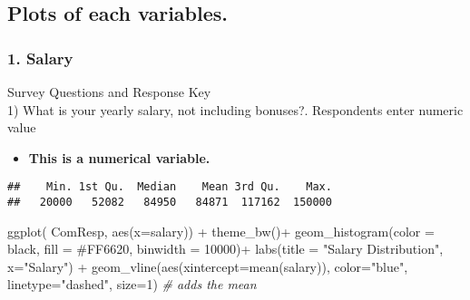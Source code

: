 \documentclass[
]{article}
\newenvironment{Shaded}{\begin{snugshade}}{\end{snugshade}}
\newcommand{\AttributeTok}[1]{\textcolor[rgb]{0.77,0.63,0.00}{#1}}
\newcommand{\CommentTok}[1]{\textcolor[rgb]{0.56,0.35,0.01}{\textit{#1}}}
\newcommand{\DecValTok}[1]{\textcolor[rgb]{0.00,0.00,0.81}{#1}}
\newcommand{\FunctionTok}[1]{\textcolor[rgb]{0.00,0.00,0.00}{#1}}
\newcommand{\NormalTok}[1]{#1}
\newcommand{\SpecialCharTok}[1]{\textcolor[rgb]{0.00,0.00,0.00}{#1}}
\newcommand{\StringTok}[1]{\textcolor[rgb]{0.31,0.60,0.02}{#1}}
\providecommand{\tightlist}{%
  \setlength{\itemsep}{0pt}\setlength{\parskip}{0pt}}
\begin{document}
\hypertarget{plots-of-each-variables.}{%
\subsection{Plots of each variables.}\label{plots-of-each-variables.}}

\hypertarget{salary}{%
\subsubsection{1. Salary}\label{salary}}

Survey Questions and Response Key\\
1) What is your yearly salary, not including bonuses?. Respondents enter
numeric value

\begin{itemize}
\tightlist
\item
  \textbf{This is a numerical variable. }
\end{itemize}

\begin{Shaded}
\end{Shaded}

\begin{verbatim}
##    Min. 1st Qu.  Median    Mean 3rd Qu.    Max. 
##   20000   52082   84950   84871  117162  150000
\end{verbatim}

\begin{Shaded}
\begin{Highlighting}[]
\FunctionTok{ggplot}\NormalTok{( ComResp, }\FunctionTok{aes}\NormalTok{(}\AttributeTok{x=}\NormalTok{salary)) }\SpecialCharTok{+} \FunctionTok{theme\_bw}\NormalTok{()}\SpecialCharTok{+}
  \FunctionTok{geom\_histogram}\NormalTok{(}\AttributeTok{color =} \StringTok{\textquotesingle{}black\textquotesingle{}}\NormalTok{, }\AttributeTok{fill =} \StringTok{\textquotesingle{}\#FF6620\textquotesingle{}}\NormalTok{, }\AttributeTok{binwidth =} \DecValTok{10000}\NormalTok{)}\SpecialCharTok{+}
  \FunctionTok{labs}\NormalTok{(}\AttributeTok{title =} \StringTok{"Salary Distribution"}\NormalTok{, }\AttributeTok{x=}\StringTok{"Salary"}\NormalTok{) }\SpecialCharTok{+} 
  \FunctionTok{geom\_vline}\NormalTok{(}\FunctionTok{aes}\NormalTok{(}\AttributeTok{xintercept=}\FunctionTok{mean}\NormalTok{(salary)), }\AttributeTok{color=}\StringTok{"blue"}\NormalTok{, }\AttributeTok{linetype=}\StringTok{"dashed"}\NormalTok{, }\AttributeTok{size=}\DecValTok{1}\NormalTok{)  }\CommentTok{\# adds the mean}
\end{Highlighting}
\end{Shaded}
\end{document}
